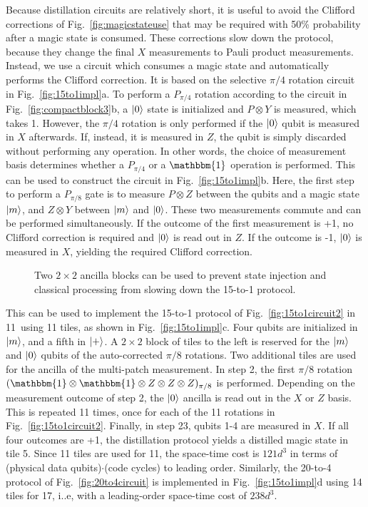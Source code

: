 \documentclass[prx,aps,letterpaper,twocolumn,allowfontchageintitle=true,accepted=2019-02-01]{quantumarticle}
\begin{document}
Because distillation circuits are relatively short, it is useful to avoid the Clifford corrections of Fig.~\ref{fig:magicstateuse} that may be required with 50\% probability after a magic state is consumed. These corrections slow down the protocol, because they change the final $X$ measurements to Pauli product measurements. Instead, we use a circuit which consumes a magic state and automatically performs the Clifford correction. It is based on the selective $\pi/4$ rotation circuit in Fig.~\ref{fig:15to1impl}a. To perform a $P_{\pi/4}$ rotation according to the circuit in Fig.~\ref{fig:compactblock3}b, a $\ket{0}$ state is initialized and $P \otimes Y$ is measured, which takes 1\clock. However, the $\pi/4$ rotation is only performed if the $\ket{0}$ qubit is measured in $X$ afterwards. If, instead, it is measured in $Z$, the qubit is simply discarded without performing any operation. In other words, the choice of measurement basis determines whether a $P_{\pi/4}$ or a $\mathbbm{1}$ operation is performed. This can be used to construct the circuit in Fig.~\ref{fig:15to1impl}b. Here, the first step to perform a $P_{\pi/8}$ gate is to measure $P \otimes Z$ between the qubits and a magic state $\ket{m}$, and $Z \otimes Y$ between $\ket{m}$ and $\ket{0}$. These two measurements commute and can be performed simultaneously. If the outcome of the first measurement is +1, no Clifford correction is required and $\ket{0}$ is read out in $Z$. If the outcome is -1, $\ket{0}$ is measured in $X$, yielding the required Clifford correction.



\begin{figure}[b!]
\centering
\def\svgwidth{\linewidth}

\caption{Two $2\times 2$ ancilla blocks can be used to prevent state injection and classical processing from slowing down the 15-to-1 protocol.}
\label{fig:15to1noslowdown}
\end{figure}


This can be used to implement the 15-to-1 protocol of Fig.~\ref{fig:15to1circuit2} in 11\clock \ using 11 tiles, as shown in Fig.~\ref{fig:15to1impl}c. Four qubits are initialized in $\ket{m}$, and a fifth in $\ket{+}$. A $2\times 2$ block of tiles to the left is reserved for the $\ket{m}$ and $\ket{0}$ qubits of the auto-corrected $\pi/8$ rotations. Two additional tiles are used for the ancilla of the multi-patch measurement. In step 2, the first $\pi/8$ rotation $(\mathbbm{1} \otimes \mathbbm{1} \otimes Z \otimes Z \otimes Z)_{\pi/8}$ is performed. Depending on the measurement outcome of step 2, the $\ket{0}$ ancilla is read out in the $X$ or $Z$ basis. This is repeated 11 times, once for each of the 11 rotations in Fig.~\ref{fig:15to1circuit2}. Finally, in step 23, qubits 1-4 are measured in $X$. If all four outcomes are +1, the distillation protocol yields a distilled magic state in tile 5. Since 11 tiles are used for 11\clock, the space-time cost is $121d^3$ in terms of (physical data qubits)$\cdot$(code cycles) to leading order. Similarly, the 20-to-4 protocol of Fig.~\ref{fig:20to4circuit} is implemented in Fig.~\ref{fig:15to1impl}d using 14 tiles for 17\clock, i..e, with a leading-order space-time cost of $238d^3$.
\end{document}

